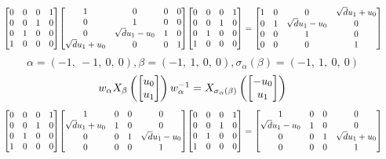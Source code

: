 \documentclass[11pt]{article}
\theoremstyle{definition}
\begin{document}
\[
\scaletoalign{\textwidth}{{\left[\begin{matrix}0 & 0 & 0 & 1\\0 & 0 & 1 & 0\\0 & 1 & 0 & 0\\1 & 0 & 0 & 0\end{matrix}\right]} {\left[\begin{matrix}1 & 0 & 0 & 0\\0 & 1 & 0 & 0\\0 & \sqrt{d} u_{1} - u_{0} & 1 & 0\\\sqrt{d} u_{1} + u_{0} & 0 & 0 & 1\end{matrix}\right]} {\left[\begin{matrix}0 & 0 & 0 & 1\\0 & 0 & 1 & 0\\0 & 1 & 0 & 0\\1 & 0 & 0 & 0\end{matrix}\right]} = {\left[\begin{matrix}1 & 0 & 0 & \sqrt{d} u_{1} + u_{0}\\0 & 1 & \sqrt{d} u_{1} - u_{0} & 0\\0 & 0 & 1 & 0\\0 & 0 & 0 & 1\end{matrix}\right]}}
\]
\[
\alpha = \left( -1, \  -1, \  0, \  0\right), \beta = \left( -1, \  1, \  0, \  0\right), \sigma_{\alpha}(\beta) = \left( -1, \  1, \  0, \  0\right)
\]
\[
\scaletoalign{\textwidth}{w_{\alpha} X_{\beta}\left(\left[\begin{matrix}u_{0}\\u_{1}\end{matrix}\right]\right) w_{\alpha}^{-1} = X_{\sigma_{\alpha}\left(\beta\right)}\left(\left[\begin{matrix}- u_{0}\\u_{1}\end{matrix}\right]\right)}
\]
\[
\scaletoalign{\textwidth}{{\left[\begin{matrix}0 & 0 & 0 & 1\\0 & 0 & 1 & 0\\0 & 1 & 0 & 0\\1 & 0 & 0 & 0\end{matrix}\right]} {\left[\begin{matrix}1 & 0 & 0 & 0\\\sqrt{d} u_{1} + u_{0} & 1 & 0 & 0\\0 & 0 & 1 & \sqrt{d} u_{1} - u_{0}\\0 & 0 & 0 & 1\end{matrix}\right]} {\left[\begin{matrix}0 & 0 & 0 & 1\\0 & 0 & 1 & 0\\0 & 1 & 0 & 0\\1 & 0 & 0 & 0\end{matrix}\right]} = {\left[\begin{matrix}1 & 0 & 0 & 0\\\sqrt{d} u_{1} - u_{0} & 1 & 0 & 0\\0 & 0 & 1 & \sqrt{d} u_{1} + u_{0}\\0 & 0 & 0 & 1\end{matrix}\right]}}
\]
\end{document}
